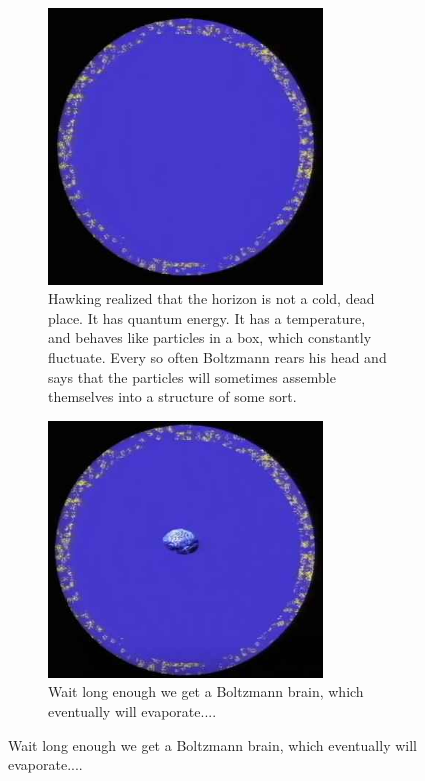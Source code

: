 \documentclass[]{article}
\begin{document}
\begin{figure}[H]
\begin{center}
		\begin{subfigure}[t]{0.45\textwidth}
			\caption{Hawking realized that the horizon is not a cold, dead place. It has quantum energy. It has a temperature, and behaves like particles in a box, which constantly fluctuate. Every so often Boltzmann rears his head and says that the particles will sometimes assemble themselves into a structure of some sort.}\label{fig:wt1ws-hawking}
			\includegraphics[width=0.8\textwidth]{wt1ws-hawking}
		\end{subfigure}
		\begin{subfigure}[t]{0.45\textwidth}
			\caption{Wait long enough we get a Boltzmann brain, which eventually will evaporate....}\label{fig:wt1ws-hawking-bolzmann}
			\includegraphics[width=0.8\textwidth]{wt1ws-hawking-bolzmann}
		\end{subfigure}

	\end{center}
\end{figure}
\end{document}
